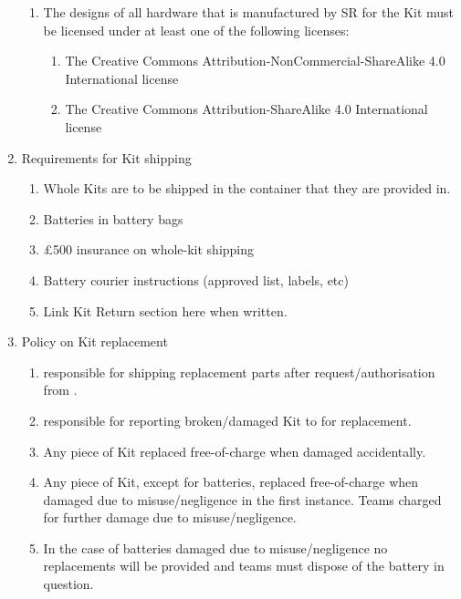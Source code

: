 \begin{draft}
\begin{enumerate}
\begin{enumerate}
  \item The designs of all hardware that is manufactured by SR for the Kit must be licensed under at least one of the following licenses:
    \begin{enumerate}
    \item The Creative Commons Attribution-NonCommercial-ShareAlike 4.0 International license
    \item The Creative Commons Attribution-ShareAlike 4.0 International license
    \end{enumerate}
  \end{enumerate}


\item Requirements for Kit shipping
  \begin{enumerate}
    \item{Whole Kits are to be shipped in the container that they are provided in.}
    \item{Batteries in battery bags}
    \item{\pounds500 insurance on whole-kit shipping}
    \item{Battery courier instructions (approved list, labels, etc)}
    \item{Link Kit Return section here when written.}
  \end{enumerate}
\item Policy on Kit replacement
  \begin{enumerate}
    \item{ responsible for shipping replacement parts after request/authorisation from .}
    \item{ responsible for reporting broken/damaged Kit to  for replacement.}
    \item{Any piece of Kit replaced free-of-charge when damaged accidentally.}
    \item{Any piece of Kit, except for batteries, replaced free-of-charge when damaged due to misuse/negligence in the first instance. Teams charged for further damage due to misuse/negligence.}
    \item{In the case of batteries damaged due to misuse/negligence no replacements will be provided and teams must dispose of the battery in question.}
  \end{enumerate}


\end{enumerate}
\end{draft}
